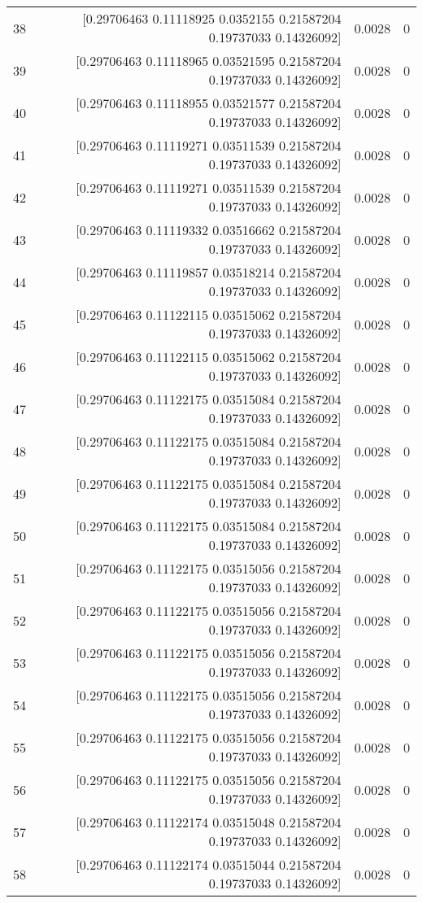 \begin{longtable}{lrrr}
38 & [0.29706463 0.11118925 0.0352155  0.21587204 0.19737033 0.14326092] & 0.0028 & 0 \\
39 & [0.29706463 0.11118965 0.03521595 0.21587204 0.19737033 0.14326092] & 0.0028 & 0 \\
40 & [0.29706463 0.11118955 0.03521577 0.21587204 0.19737033 0.14326092] & 0.0028 & 0 \\
41 & [0.29706463 0.11119271 0.03511539 0.21587204 0.19737033 0.14326092] & 0.0028 & 0 \\
42 & [0.29706463 0.11119271 0.03511539 0.21587204 0.19737033 0.14326092] & 0.0028 & 0 \\
43 & [0.29706463 0.11119332 0.03516662 0.21587204 0.19737033 0.14326092] & 0.0028 & 0 \\
44 & [0.29706463 0.11119857 0.03518214 0.21587204 0.19737033 0.14326092] & 0.0028 & 0 \\
45 & [0.29706463 0.11122115 0.03515062 0.21587204 0.19737033 0.14326092] & 0.0028 & 0 \\
46 & [0.29706463 0.11122115 0.03515062 0.21587204 0.19737033 0.14326092] & 0.0028 & 0 \\
47 & [0.29706463 0.11122175 0.03515084 0.21587204 0.19737033 0.14326092] & 0.0028 & 0 \\
48 & [0.29706463 0.11122175 0.03515084 0.21587204 0.19737033 0.14326092] & 0.0028 & 0 \\
49 & [0.29706463 0.11122175 0.03515084 0.21587204 0.19737033 0.14326092] & 0.0028 & 0 \\
50 & [0.29706463 0.11122175 0.03515084 0.21587204 0.19737033 0.14326092] & 0.0028 & 0 \\
51 & [0.29706463 0.11122175 0.03515056 0.21587204 0.19737033 0.14326092] & 0.0028 & 0 \\
52 & [0.29706463 0.11122175 0.03515056 0.21587204 0.19737033 0.14326092] & 0.0028 & 0 \\
53 & [0.29706463 0.11122175 0.03515056 0.21587204 0.19737033 0.14326092] & 0.0028 & 0 \\
54 & [0.29706463 0.11122175 0.03515056 0.21587204 0.19737033 0.14326092] & 0.0028 & 0 \\
55 & [0.29706463 0.11122175 0.03515056 0.21587204 0.19737033 0.14326092] & 0.0028 & 0 \\
56 & [0.29706463 0.11122175 0.03515056 0.21587204 0.19737033 0.14326092] & 0.0028 & 0 \\
57 & [0.29706463 0.11122174 0.03515048 0.21587204 0.19737033 0.14326092] & 0.0028 & 0 \\
58 & [0.29706463 0.11122174 0.03515044 0.21587204 0.19737033 0.14326092] & 0.0028 & 0 \\

\end{longtable}
